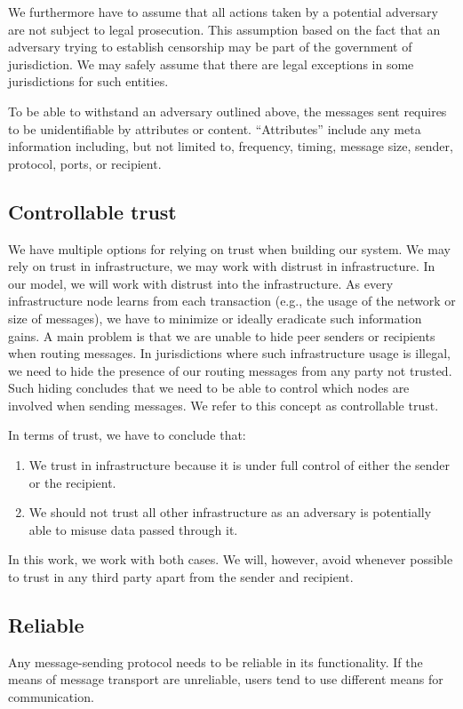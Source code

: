 We furthermore have to assume that all actions taken by a potential adversary are not subject to legal prosecution. This assumption based on the fact that an adversary trying to establish censorship may be part of the government of jurisdiction. We may safely assume that there are legal exceptions in some jurisdictions for such entities.

To be able to withstand an adversary outlined above, the messages sent requires to be unidentifiable by attributes or content. ``Attributes'' include any meta information including, but not limited to, frequency, timing, message size, sender, protocol, ports, or recipient.

\subsection{Controllable trust}
We have multiple options for relying on trust when building our system. We may rely on trust in infrastructure, we may work with distrust in infrastructure. In our model, we will work with distrust into the infrastructure. As every infrastructure node learns from each transaction (e.g., the usage of the network or size of messages), we have to minimize or ideally eradicate such information gains. A main problem is that we are unable to hide peer senders or recipients when routing messages. In jurisdictions where such infrastructure usage is illegal, we need to hide the presence of our routing messages from any party not trusted. Such hiding concludes that we need to be able to control which nodes are involved when sending messages. We refer to this concept as controllable trust.

In terms of trust, we have to conclude that:
\begin{enumerate}
	\item We trust in infrastructure because it is under full control of either the sender or the recipient.
	\item We should not trust all other infrastructure as an adversary is potentially able to misuse data passed through it.
\end{enumerate}

In this work, we work with both cases. We will, however, avoid whenever possible to trust in any third party apart from the sender and recipient.

\subsection{Reliable}
Any message-sending protocol needs to be reliable in its functionality. If the means of message transport are unreliable, users tend to use different means for communication\cite{zhou2011examining}. 

